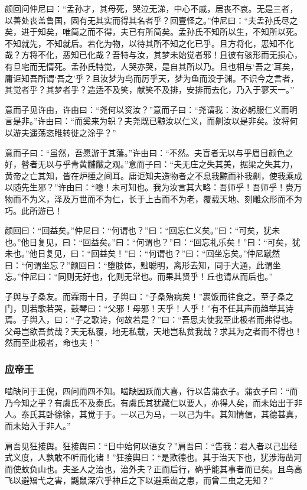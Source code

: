 \documentclass[]{article}
\begin{document}
颜回问仲尼曰：``孟孙才，其母死，哭泣无涕，中心不戚，居丧不哀。无是三者，以善处丧盖鲁国，固有无其实而得其名者乎？回壹怪之。''仲尼曰：``夫孟孙氏尽之矣，进于知矣，唯简之而不得，夫已有所简矣。孟孙氏不知所以生，不知所以死。不知就先，不知就后。若化为物，以待其所不知之化已乎。且方将化，恶知不化哉？方将不化，恶知已化哉？吾特与汝，其梦未始觉者邪！且彼有骇形而无损心，有旦宅而无情死。孟孙氏特觉，人哭亦哭，是自其所以乃。且也相与`吾之'耳矣，庸讵知吾所谓`吾之'乎？且汝梦为鸟而厉乎天，梦为鱼而没于渊。不识今之言者，其觉者乎？其梦者乎？造适不及笑，献笑不及排，安排而去化，乃入于寥天一。''

意而子见许由，许由曰：``尧何以资汝？''意而子曰：``尧谓我：汝必躬服仁义而明言是非。''许由曰：``而奚来为轵？夫尧既已黥汝以仁义，而劓汝以是非矣。汝将何以游夫遥荡恣睢转徙之涂乎？''

意而子曰：``虽然，吾愿游于其藩。''许由曰：``不然。夫盲者无以与乎眉目颜色之好，瞽者无以与乎青黄黼黻之观。''意而子曰：``夫无庄之失其美，据梁之失其力，黄帝之亡其知，皆在炉捶之间耳。庸讵知夫造物者之不息我黥而补我劓，使我乘成以随先生邪？''许由曰：``噫！未可知也。我为汝言其大略：吾师乎！吾师乎！赍万物而不为义，泽及万世而不为仁，长于上古而不为老，覆载天地、刻雕众形而不为巧。此所游已！

颜回曰：``回益矣。''仲尼曰：``何谓也？''曰：``回忘仁义矣。''曰：``可矣，犹未也。''他日复见，曰：``回益矣。''曰：``何谓也？''曰：``回忘礼乐矣！''曰：``可矣，犹未也。''他日复见，曰：``回益矣！''曰：``何谓也？''曰：``回坐忘矣。''仲尼蹴然曰：``何谓坐忘？''颜回曰：``堕肢体，黜聪明，离形去知，同于大通，此谓坐忘。''仲尼曰：``同则无好也，化则无常也。而果其贤乎！丘也请从而后也。''

子舆与子桑友。而霖雨十日，子舆曰：``子桑殆病矣！''裹饭而往食之。至子桑之门，则若歌若哭，鼓琴曰：``父邪！母邪！天乎！人乎！''有不任其声而趋举其诗焉。子舆入，曰：``子之歌诗，何故若是？''曰：``吾思夫使我至此极者而弗得也。父母岂欲吾贫哉？天无私覆，地无私载，天地岂私贫我哉？求其为之者而不得也！然而至此极者，命也夫！''

\hypertarget{header-n169}{%
\subsubsection{应帝王}\label{header-n169}}

啮缺问于王倪，四问而四不知。啮缺因跃而大喜，行以告蒲衣子。蒲衣子曰：``而乃今知之乎？有虞氏不及泰氏。有虞氏其犹藏仁以要人，亦得人矣，而未始出于非人。泰氏其卧徐徐，其觉于于。一以己为马，一以己为牛。其知情信，其德甚真，而未始入于非人。''

肩吾见狂接舆。狂接舆曰：``日中始何以语女？''肩吾曰：``告我：君人者以己出经式义度，人孰敢不听而化诸！''狂接舆曰：``是欺德也。其于治天下也，犹涉海凿河而使蚊负山也。夫圣人之治也，治外夫？正而后行，确乎能其事者而已矣。且鸟高飞以避矰弋之害，鼷鼠深穴乎神丘之下以避熏凿之患，而曾二虫之无知？''
\end{document}
